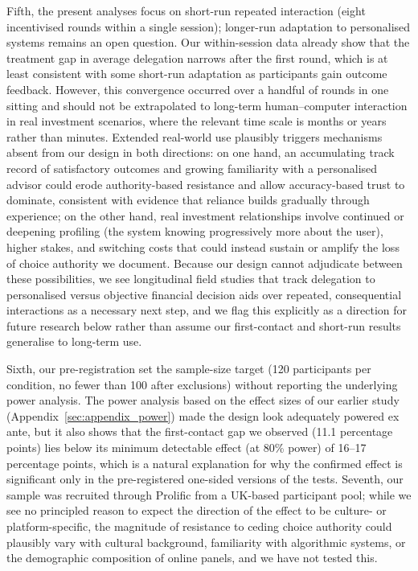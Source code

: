 \documentclass[a4paper, 12pt, fleqn]{article}
\theoremstyle{hypstyle}
\begin{document}
Fifth, the present analyses focus on short-run repeated interaction (eight incentivised rounds within a single session); longer-run adaptation to personalised systems remains an open question. Our within-session data already show that the treatment gap in average delegation narrows after the first round, which is at least consistent with some short-run adaptation as participants gain outcome feedback. However, this convergence occurred over a handful of rounds in one sitting and should not be extrapolated to long-term human--computer interaction in real investment scenarios, where the relevant time scale is months or years rather than minutes. Extended real-world use plausibly triggers mechanisms absent from our design in both directions: on one hand, an accumulating track record of satisfactory outcomes and growing familiarity with a personalised advisor could erode authority-based resistance and allow accuracy-based trust to dominate, consistent with evidence that reliance builds gradually through experience; on the other hand, real investment relationships involve continued or deepening profiling (the system knowing progressively more about the user), higher stakes, and switching costs that could instead sustain or amplify the loss of choice authority we document. Because our design cannot adjudicate between these possibilities, we see longitudinal field studies that track delegation to personalised versus objective financial decision aids over repeated, consequential interactions as a necessary next step, and we flag this explicitly as a direction for future research below rather than assume our first-contact and short-run results generalise to long-term use. 

Sixth, our pre-registration set the sample-size target (120 participants per condition, no fewer than 100 after exclusions) without reporting the underlying power analysis. The power analysis based on the effect sizes of our earlier study (Appendix~\ref{sec:appendix_power}) made the design look adequately powered ex ante, but it also shows that the first-contact gap we observed (11.1 percentage points) lies below its minimum detectable effect (at 80\% power) of 16--17 percentage points, which is a natural explanation for why the confirmed effect is significant only in the pre-registered one-sided versions of the tests. Seventh, our sample was recruited through Prolific from a UK-based participant pool; while we see no principled reason to expect the direction of the effect to be culture- or platform-specific, the magnitude of resistance to ceding choice authority could plausibly vary with cultural background, familiarity with algorithmic systems, or the demographic composition of online panels, and we have not tested this.
\end{document}
